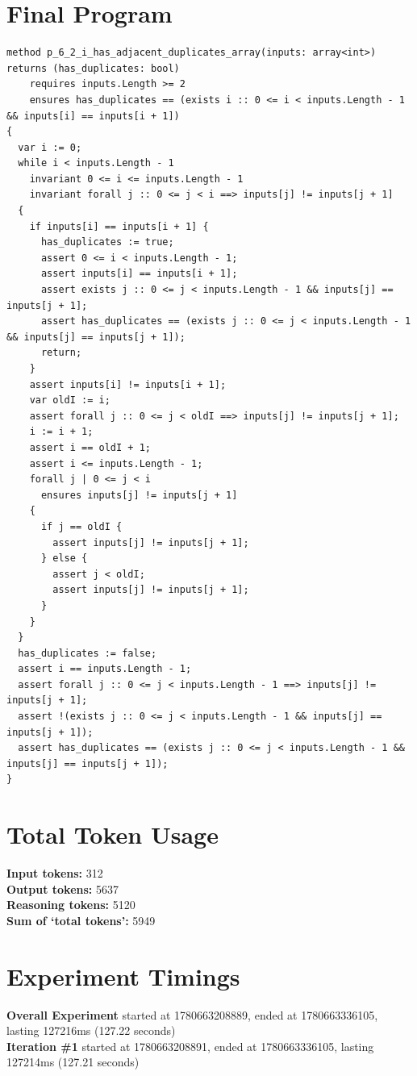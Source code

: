 \documentclass{article}
\begin{document}
\section*{Final Program}
\begin{lstlisting}
method p_6_2_i_has_adjacent_duplicates_array(inputs: array<int>) returns (has_duplicates: bool)
	requires inputs.Length >= 2
	ensures has_duplicates == (exists i :: 0 <= i < inputs.Length - 1 && inputs[i] == inputs[i + 1])
{
  var i := 0;
  while i < inputs.Length - 1
    invariant 0 <= i <= inputs.Length - 1
    invariant forall j :: 0 <= j < i ==> inputs[j] != inputs[j + 1]
  {
    if inputs[i] == inputs[i + 1] {
      has_duplicates := true;
      assert 0 <= i < inputs.Length - 1;
      assert inputs[i] == inputs[i + 1];
      assert exists j :: 0 <= j < inputs.Length - 1 && inputs[j] == inputs[j + 1];
      assert has_duplicates == (exists j :: 0 <= j < inputs.Length - 1 && inputs[j] == inputs[j + 1]);
      return;
    }
    assert inputs[i] != inputs[i + 1];
    var oldI := i;
    assert forall j :: 0 <= j < oldI ==> inputs[j] != inputs[j + 1];
    i := i + 1;
    assert i == oldI + 1;
    assert i <= inputs.Length - 1;
    forall j | 0 <= j < i
      ensures inputs[j] != inputs[j + 1]
    {
      if j == oldI {
        assert inputs[j] != inputs[j + 1];
      } else {
        assert j < oldI;
        assert inputs[j] != inputs[j + 1];
      }
    }
  }
  has_duplicates := false;
  assert i == inputs.Length - 1;
  assert forall j :: 0 <= j < inputs.Length - 1 ==> inputs[j] != inputs[j + 1];
  assert !(exists j :: 0 <= j < inputs.Length - 1 && inputs[j] == inputs[j + 1]);
  assert has_duplicates == (exists j :: 0 <= j < inputs.Length - 1 && inputs[j] == inputs[j + 1]);
}
\end{lstlisting}
\section*{Total Token Usage}
\textbf{Input tokens: }312
\\\textbf{Output tokens: }5637
\\\textbf{Reasoning tokens: }5120
\\\textbf{Sum of `total tokens': }5949
\section*{Experiment Timings}
\textbf{Overall Experiment} started at 1780663208889, ended at 1780663336105, lasting 127216ms (127.22 seconds)
\\\textbf{Iteration \#1} started at 1780663208891, ended at 1780663336105, lasting 127214ms (127.21 seconds)
\end{document}
